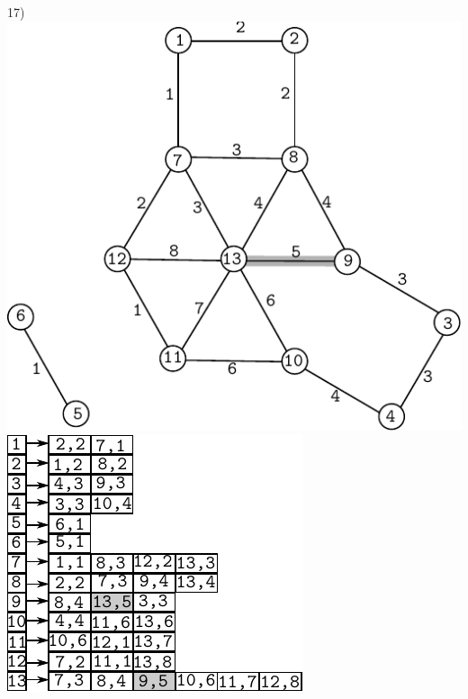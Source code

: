 \documentclass{article}
\begin{document}
\begin{center}
17)\includegraphics[scale=0.6]{bottleneck/g17}
\hspace{5mm}
\includegraphics[scale=0.9]{bottleneck/l17}
\end{center}
\end{document}
